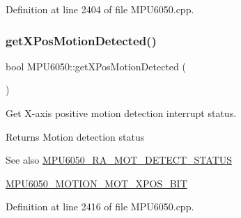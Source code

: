 Definition at line 2404 of file M\+P\+U6050.\+cpp.


\begin{DoxyCode}{0}

\end{DoxyCode}
\mbox{\label{classMPU6050_a410af58f5ff5f74e4ef8d61495908226}} 
\subsubsection{\texorpdfstring{getXPosMotionDetected()}{getXPosMotionDetected()}}
{\footnotesize\ttfamily bool M\+P\+U6050\+::get\+X\+Pos\+Motion\+Detected (\begin{DoxyParamCaption}{ }\end{DoxyParamCaption})}

Get X-\/axis positive motion detection interrupt status. \begin{DoxyReturn}{Returns}
Motion detection status 
\end{DoxyReturn}
\begin{DoxySeeAlso}{See also}
\mbox{\hyperlink{MPU6050_8h_a5b725ca4941b1a73f8e4df3d7164d514}{M\+P\+U6050\+\_\+\+R\+A\+\_\+\+M\+O\+T\+\_\+\+D\+E\+T\+E\+C\+T\+\_\+\+S\+T\+A\+T\+US}} 

\mbox{\hyperlink{MPU6050_8h_aa8e676899573e11b356291e335cbe340}{M\+P\+U6050\+\_\+\+M\+O\+T\+I\+O\+N\+\_\+\+M\+O\+T\+\_\+\+X\+P\+O\+S\+\_\+\+B\+IT}} 
\end{DoxySeeAlso}


Definition at line 2416 of file M\+P\+U6050.\+cpp.


